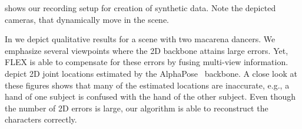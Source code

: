 
 shows our recording setup for creation of synthetic data. Note the depicted cameras, that dynamically move in the scene.


In  we depict qualitative results for a scene with two macarena dancers. We emphasize several viewpoints where the 2D backbone attains large errors. Yet, FLEX is able to compensate for these errors by fusing multi-view information.
 depict 2D joint locations estimated by the AlphaPose~\cite{alphapose} backbone. A close look at these figures shows that many of the estimated locations are inaccurate, e.g., a hand of one subject is confused with the hand of the other subject. Even though the number of 2D errors is large, our algorithm is able to reconstruct the characters correctly.


